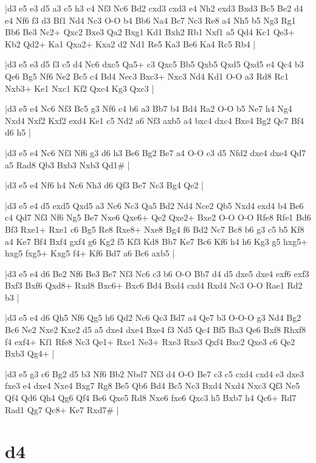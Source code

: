 \whitename{}
\blackname{}
\makegametitle
|d3 e5 e3 d5 a3 c5 h3 c4 Nf3 Nc6 Bd2 cxd3 cxd3 e4 Nh2 exd3 Bxd3 Bc5 Be2 d4 e4 Nf6 f3 d3 Bf1 Nd4 Nc3 O-O b4 Bb6 Na4 Bc7 Nc3 Re8 a4 Nh5 b5 Ng3 Rg1 Bb6 Be3 Nc2+ Qxc2 Bxe3 Qa2 Bxg1 Kd1 Bxh2 Rb1 Nxf1 a5 Qd4 Kc1 Qe3+ Kb2 Qd2+ Ka1 Qxa2+ Kxa2 d2 Nd1 Re5 Ka3 Be6 Ka4 Rc5 Rb4  |

\whitename{}
\blackname{}
\makegametitle
|d3 e5 e3 d5 f3 c5 d4 Nc6 dxc5 Qa5+ c3 Qxc5 Bb5 Qxb5 Qxd5 Qxd5 e4 Qc4 b3 Qe6 Bg5 Nf6 Ne2 Bc5 c4 Bd4 Nec3 Bxc3+ Nxc3 Nd4 Kd1 O-O a3 Rd8 Rc1 Nxb3+ Ke1 Nxc1 Kf2 Qxc4 Kg3 Qxc3  |

\whitename{}
\blackname{}
\makegametitle
|d3 e5 e4 Nc6 Nf3 Bc5 g3 Nf6 c4 b6 a3 Bb7 b4 Bd4 Ra2 O-O b5 Ne7 h4 Ng4 Nxd4 Nxf2 Kxf2 exd4 Ke1 c5 Nd2 a6 Nf3 axb5 a4 bxc4 dxc4 Bxe4 Bg2 Qc7 Bf4 d6 h5  |

\whitename{}
\blackname{}
\makegametitle
|d3 e5 e4 Nc6 Nf3 Nf6 g3 d6 h3 Be6 Bg2 Be7 a4 O-O c3 d5 Nfd2 dxe4 dxe4 Qd7 a5 Rad8 Qb3 Bxb3 Nxb3 Qd1\#  |

\whitename{}
\blackname{}
\makegametitle
|d3 e5 e4 Nf6 h4 Nc6 Nh3 d6 Qf3 Be7 Nc3 Bg4 Qe2  |

\whitename{}
\blackname{}
\makegametitle
|d3 e5 e4 d5 exd5 Qxd5 a3 Nc6 Nc3 Qa5 Bd2 Nd4 Nce2 Qb5 Nxd4 exd4 b4 Be6 c4 Qd7 Nf3 Nf6 Ng5 Be7 Nxe6 Qxe6+ Qe2 Qxe2+ Bxe2 O-O O-O Rfe8 Rfe1 Bd6 Bf3 Rxe1+ Rxe1 c6 Bg5 Re8 Rxe8+ Nxe8 Bg4 f6 Bd2 Nc7 Bc8 b6 g3 c5 b5 Kf8 a4 Ke7 Bf4 Bxf4 gxf4 g6 Kg2 f5 Kf3 Kd8 Bb7 Ke7 Bc6 Kf6 h4 h6 Kg3 g5 hxg5+ hxg5 fxg5+ Kxg5 f4+ Kf6 Bd7 a6 Bc6 axb5  |

\whitename{}
\blackname{}
\makegametitle
|d3 e5 e4 d6 Be2 Nf6 Be3 Be7 Nf3 Nc6 c3 b6 O-O Bb7 d4 d5 dxe5 dxe4 exf6 exf3 Bxf3 Bxf6 Qxd8+ Rxd8 Bxc6+ Bxc6 Bd4 Bxd4 cxd4 Rxd4 Nc3 O-O Rae1 Rd2 b3  |

\whitename{}
\blackname{}
\makegametitle
|d3 e5 e4 d6 Qh5 Nf6 Qg5 h6 Qd2 Nc6 Qc3 Bd7 a4 Qe7 b3 O-O-O g3 Nd4 Bg2 Bc6 Ne2 Nxe2 Kxe2 d5 a5 dxe4 dxe4 Bxe4 f3 Nd5 Qc4 Bf5 Ba3 Qe6 Bxf8 Rhxf8 f4 exf4+ Kf1 Rfe8 Nc3 Qe1+ Rxe1 Ne3+ Rxe3 Rxe3 Qxf4 Bxc2 Qxe3 c6 Qe2 Bxb3 Qg4+  |

\whitename{}
\blackname{}
\makegametitle
|d3 e5 g3 c6 Bg2 d5 b3 Nf6 Bb2 Nbd7 Nf3 d4 O-O Be7 c3 c5 cxd4 cxd4 e3 dxe3 fxe3 e4 dxe4 Nxe4 Bxg7 Rg8 Be5 Qb6 Bd4 Bc5 Nc3 Bxd4 Nxd4 Nxc3 Qf3 Ne5 Qf4 Qd6 Qh4 Qg6 Qf4 Be6 Qxe5 Rd8 Nxe6 fxe6 Qxc3 h5 Bxb7 h4 Qc6+ Rd7 Rad1 Qg7 Qc8+ Ke7 Rxd7\#  |

\section{d4}

